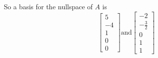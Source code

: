 So a basis for the nullspace of $A$ is
$$
	\begin{bmatrix}5\\-4\\1\\0\\0\end{bmatrix} \text{and} \begin{bmatrix}-2\\-\frac{3}{2}\\0\\1\\1\end{bmatrix}
$$
